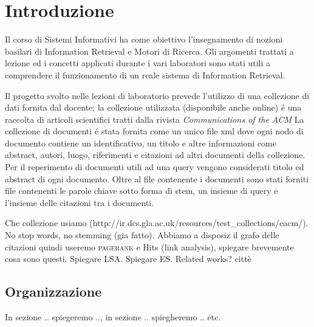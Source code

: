 \section{Introduzione}
\label{sec:introduzione}

Il corso di Sistemi Informativi ha come obiettivo l'insegnamento di nozioni basilari di Information Retrieval e Motori di Ricerca. Gli argomenti trattati a lezione ed i concetti applicati durante i vari laboratori sono stati utili a comprendere il funzionamento di un reale sistema di Information Retrieval.

Il progetto svolto nelle lezioni di laboratorio prevede l'utilizzo di una collezione di dati fornita dal docente; la collezione utilizzata (disponibile anche online) \'e una raccolta di articoli scientifici tratti dalla rivista \textit{Communications of the ACM} \cite{ACMCollection} %
La collezione di documenti \'e stata fornita come un unico file xml dove ogni nodo di documento contiene un identificativo, un titolo e altre informazioni come abstract, autori, luogo, riferimenti e citazioni ad altri documenti della collezione. Per il reperimento di documenti utili ad una query vengono considerati titolo ed abstract di ogni documento.
Oltre al file contenente i documenti sono stati forniti file contenenti le parole chiave sotto forma di stem, un insieme di query e l'insieme delle citazioni tra i documenti.



\vspace{30px}
Che collezione usiamo (http://ir.dcs.gla.ac.uk/resources/test\_collections/cacm/). No stop words, no stemming (gia fatto). 
Abbiamo a disposiz il grafo delle citazioni quindi useremo \textsc{pagerank} e Hits (link analysis), spiegare brevemente cosa sono questi. Spiegare LSA. Spiegare ES. Related works?  citt\`e
\subsection{Organizzazione}
In sezione .. spiegeremo .., in sezione .. spiegheremo .. etc.

%
